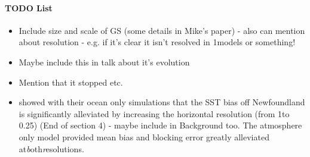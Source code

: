 \documentclass[..\EOYR.tex]{subfiles}
\begin{document}
\paragraph{TODO List}
\begin{itemize}
	\item Include size and scale of GS (some details in Mike's paper) - also can mention about resolution - e.g. if it's clear it isn't resolved in 1\degree models or something!
	\item Maybe include this in talk about it's evolution
	\item Mention that it stopped etc.
	\item \citep{Scaife2011a} showed with their ocean only simulations that the SST bias off Newfoundland is significantly alleviated by increasing the horizontal resolution (from 1\degree to 0.25\degree) (End of section 4) - maybe include in Background too. The atmosphere only model provided mean bias and blocking error greatly alleviated at\textit both\textit resolutions.
\end{itemize}
\end{document}
